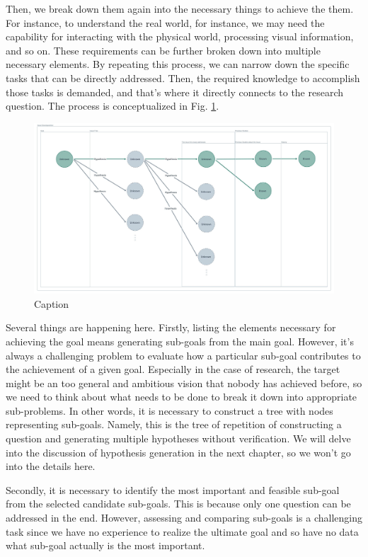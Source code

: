 Then, we break down them again into the necessary things to achieve the them. For instance, to understand the real world, for instance, we may need the capability for interacting with the physical world, processing visual information, and so on. These requirements can be further broken down into multiple necessary elements. By repeating this process, we can narrow down the specific tasks that can be directly addressed. Then, the required knowledge to accomplish those tasks is demanded, and that's where it directly connects to the research question. The process is conceptualized in Fig. \ref{fig:unknown_tree}.


\begin{figure}[htb]
    \centering
    \includegraphics[width=\textwidth]{figs/unknown_tree.jpeg}
    \caption{Caption}
    \label{fig:unknown_tree}
\end{figure}

Several things are happening here. Firstly, listing the elements necessary for achieving the goal means generating sub-goals from the main goal. However, it's always a challenging problem to evaluate how a particular sub-goal contributes to the achievement of a given goal. Especially in the case of research, the target might be an too general and ambitious vision that nobody has achieved before, so we need to think about what needs to be done to break it down into appropriate sub-problems. In other words, it is necessary to construct a tree with nodes representing sub-goals. Namely, this is the tree of repetition of constructing a question and generating multiple hypotheses without verification. We will delve into the discussion of hypothesis generation in the next chapter, so we won't go into the details here.

Secondly, it is necessary to identify the most important and feasible sub-goal from the selected candidate sub-goals. This is because only one question can be addressed in the end. However, assessing and comparing sub-goals is a challenging task since we have no experience to realize the ultimate goal and so have no data what sub-goal actually is the most important.

